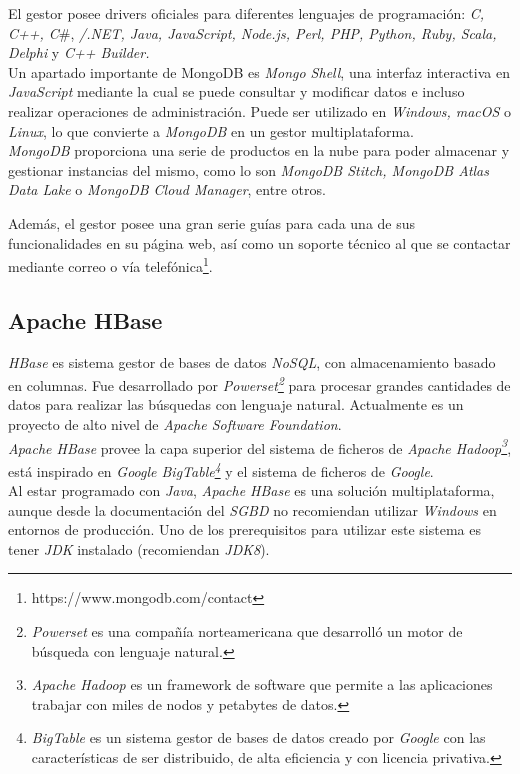 \documentclass[10pt]{article}
\begin{document}
El gestor posee drivers oficiales para diferentes lenguajes de programación: \emph{C, C++, C}\#, \emph{/.NET, Java, JavaScript, Node.js, Perl, PHP, Python, Ruby, Scala, Delphi} y \emph{C++ Builder.}\\

Un apartado importante de MongoDB es \emph{Mongo Shell}\cite{MDB:6}, una interfaz interactiva en \emph{JavaScript} mediante la cual se puede consultar y modificar datos e incluso realizar operaciones de administración. Puede ser utilizado en \emph{Windows, macOS} o \emph{Linux}, lo que convierte a \emph{MongoDB} en un gestor multiplataforma.\\

\emph{MongoDB} proporciona una serie de productos en la nube para poder almacenar y gestionar instancias del mismo, como lo son \emph{MongoDB Stitch, MongoDB Atlas Data Lake} o \emph{MongoDB Cloud Manager}, entre otros.\cite{MDB:7}

Además, el gestor posee una gran serie guías para cada una de sus funcionalidades en su página web\cite{MDB:8}, así como un soporte técnico al que se contactar mediante correo o vía telefónica\footnote{https://www.mongodb.com/contact}.

\subsection{Apache HBase}

\emph{HBase} es sistema gestor de bases de datos \emph{NoSQL}, con almacenamiento basado en columnas. Fue desarrollado por \emph{Powerset\footnote{\emph{Powerset} es una compañía norteamericana que desarrolló un motor de búsqueda con lenguaje natural.\cite{WIKI:7}}} para procesar grandes cantidades de datos para realizar las búsquedas con lenguaje natural. Actualmente es un proyecto de alto nivel de \emph{Apache Software Foundation}. \cite{WIKI:8}\\
\emph{Apache HBase} provee la capa superior del sistema de ficheros de \emph{Apache Hadoop\footnote{\emph{Apache Hadoop} es un framework de software que permite a las aplicaciones trabajar con miles de nodos y petabytes de datos.\cite{WIKI:9}}}, está inspirado en \emph{Google BigTable\footnote{\emph{BigTable} es un sistema gestor de bases de datos creado por \emph{Google} con las características de ser distribuido, de alta eficiencia y con licencia privativa.\cite{WIKI:10}}} y el sistema de ficheros de \emph{Google}.\\

Al estar programado con \emph{Java}, \emph{Apache HBase} es una solución multiplataforma, aunque desde la documentación del \emph{SGBD} no recomiendan utilizar \emph{Windows} en entornos de producción. Uno de los prerequisitos para utilizar este sistema es tener \emph{JDK} instalado (recomiendan \emph{JDK8}). \cite{AP:6}\\
\end{document}
